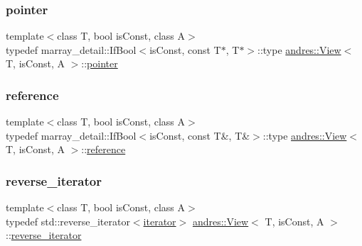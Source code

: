 \subsubsection{\texorpdfstring{pointer}{pointer}}
{\footnotesize\ttfamily template$<$class T, bool is\+Const, class A$>$ \\
typedef marray\+\_\+detail\+::\+If\+Bool$<$is\+Const, const T$\ast$, T$\ast$$>$\+::type \hyperlink{classandres_1_1View}{andres\+::\+View}$<$ T, is\+Const, A $>$\+::\hyperlink{classandres_1_1View_a9a201594c82be89fccd0fe644ea2f09c}{pointer}}

\mbox{\label{classandres_1_1View_aebdd1f19272b743b4422ff8ba18fc11a}} 
\subsubsection{\texorpdfstring{reference}{reference}}
{\footnotesize\ttfamily template$<$class T, bool is\+Const, class A$>$ \\
typedef marray\+\_\+detail\+::\+If\+Bool$<$is\+Const, const T\&, T\&$>$\+::type \hyperlink{classandres_1_1View}{andres\+::\+View}$<$ T, is\+Const, A $>$\+::\hyperlink{classandres_1_1View_aebdd1f19272b743b4422ff8ba18fc11a}{reference}}

\mbox{\label{classandres_1_1View_aab07af42756759420211d114bb705547}} 
\subsubsection{\texorpdfstring{reverse\+\_\+iterator}{reverse\_iterator}}
{\footnotesize\ttfamily template$<$class T, bool is\+Const, class A$>$ \\
typedef std\+::reverse\+\_\+iterator$<$\hyperlink{classandres_1_1View_aef54ee0a58e755b897398493d05a44df}{iterator}$>$ \hyperlink{classandres_1_1View}{andres\+::\+View}$<$ T, is\+Const, A $>$\+::\hyperlink{classandres_1_1View_aab07af42756759420211d114bb705547}{reverse\+\_\+iterator}}

\mbox{\label{classandres_1_1View_aa80ab78f6e3a32ead389d657f6ec7308}} 
